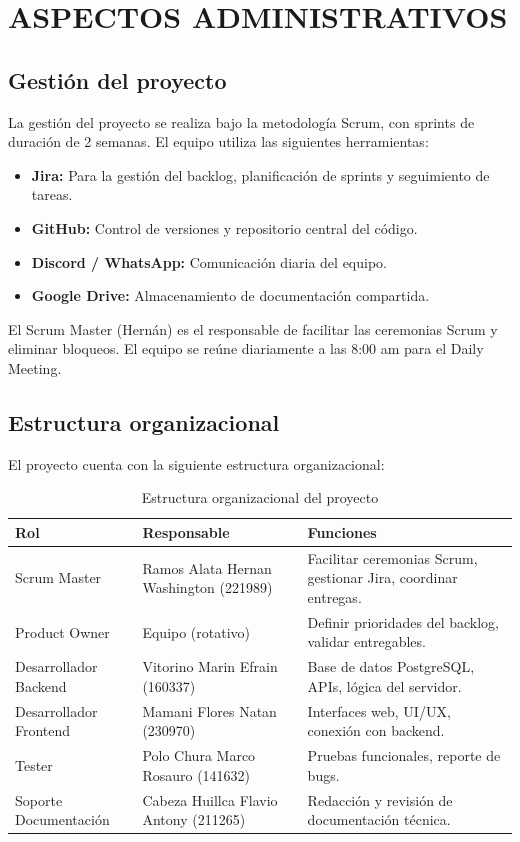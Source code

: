 \newpage
\chapter{ASPECTOS ADMINISTRATIVOS}

\section{Gestión del proyecto}

La gestión del proyecto se realiza bajo la metodología Scrum, con sprints de duración de 2 semanas. El equipo utiliza las siguientes herramientas:

\begin{itemize}
    \item \textbf{Jira:} Para la gestión del backlog, planificación de sprints y seguimiento de tareas.
    \item \textbf{GitHub:} Control de versiones y repositorio central del código.
    \item \textbf{Discord / WhatsApp:} Comunicación diaria del equipo.
    \item \textbf{Google Drive:} Almacenamiento de documentación compartida.
\end{itemize}

El Scrum Master (Hernán) es el responsable de facilitar las ceremonias Scrum y eliminar bloqueos. El equipo se reúne diariamente a las 8:00 am para el Daily Meeting.

\section{Estructura organizacional}

El proyecto cuenta con la siguiente estructura organizacional:

\begin{table}[H]
    \centering
    \caption{Estructura organizacional del proyecto}
    \begin{tabular}{|p{4cm}|p{3.5cm}|p{6.5cm}|}
        \hline
        \textbf{Rol} & \textbf{Responsable} & \textbf{Funciones} \\
        \hline
        Scrum Master & Ramos Alata Hernan Washington (221989) & Facilitar ceremonias Scrum, gestionar Jira, coordinar entregas. \\
        \hline
        Product Owner & Equipo (rotativo) & Definir prioridades del backlog, validar entregables. \\
        \hline
        Desarrollador Backend & Vitorino Marin Efrain (160337) & Base de datos PostgreSQL, APIs, lógica del servidor. \\
        \hline
        Desarrollador Frontend & Mamani Flores Natan (230970) & Interfaces web, UI/UX, conexión con backend. \\
        \hline
        Tester & Polo Chura Marco Rosauro (141632) & Pruebas funcionales, reporte de bugs. \\
        \hline
        Soporte Documentación & Cabeza Huillca Flavio Antony (211265) & Redacción y revisión de documentación técnica. \\
        \hline
    \end{tabular}
\end{table}

